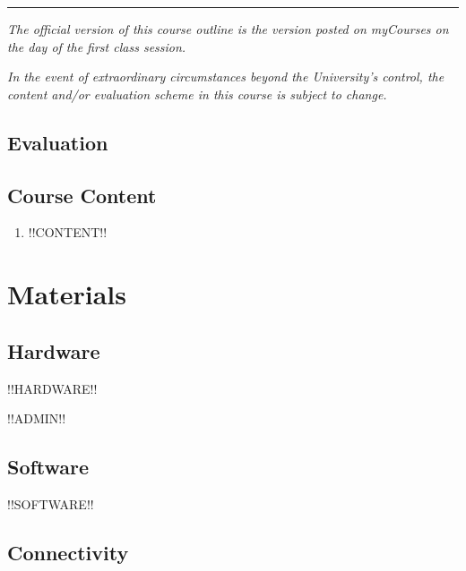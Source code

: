 \documentclass{article}
\begin{document}
\hrule
 
{\em The official version of this course outline is the version posted
  on myCourses on the day of the first class session.}

{\em In the event of extraordinary circumstances beyond the
  University's control, the content and/or evaluation scheme in this
  course is subject to change.}


\newpage

\subsection{Evaluation}
\label{eval}

\begin{center}
\end{center}

\newpage

\subsection{Course Content}

\begin{enumerate}
\item{!!CONTENT!!}
\end{enumerate}

\newpage

\section{Materials}


\subsection{Hardware}

!!HARDWARE!!

!!ADMIN!!

\subsection{Software}

!!SOFTWARE!!

\subsection{Connectivity}
\end{document}
